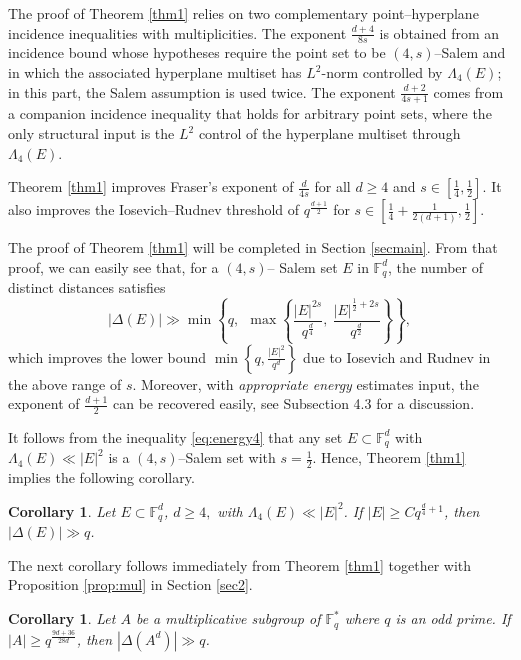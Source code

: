 \documentclass[11pt]{article}
\newtheorem{corollary}[theorem]{Corollary}
\begin{document}
The proof of Theorem \ref{thm1} relies on two complementary
point--hyperplane incidence inequalities with multiplicities. The exponent
\(\frac{d+4}{8s}\) is obtained from an incidence bound whose hypotheses require
the point set to be \((4,s)\)--Salem and in which the associated hyperplane
multiset has \(L^2\)-norm controlled by \(\Lambda_4(E)\); in this part, the
Salem assumption is used twice. The exponent \(\frac{d+2}{4s+1}\) comes from a
companion incidence inequality that holds for arbitrary point sets, where the
only structural input is the \(L^2\) control of the hyperplane multiset through
\(\Lambda_4(E)\).



 Theorem \ref{thm1} improves Fraser's exponent of $\frac{d}{4s}$ for all $d \geq 4$ and $s \in [\frac{1}{4}, \frac{1}{2}]$. It also improves the Iosevich--Rudnev threshold of $q^{\frac{d+1}{2}}$ for $s \in [\frac{1}{4} + \frac{1}{2(d+1)}, \frac{1}{2}]$.


The proof of Theorem \ref{thm1} will be completed in Section \ref{secmain}. From that proof, we can easily see that, for a $(4, s)$-- Salem set $E$ in $\mathbb{F}_q^d$, the number of distinct distances satisfies
\[|\Delta(E)|\gg \min \left\lbrace q, ~~\max\left\lbrace \frac{|E|^{2s}}{q^{\frac{d}{4}}}, ~\frac{|E|^{\frac{1}{2}+2s}}{q^{\frac{d}{2}}}\right\rbrace \right\rbrace,\]
which improves the lower bound $\min\left\lbrace q, \frac{|E|^2}{q^d}\right\rbrace$ due to Iosevich and Rudnev in the above range of $s$. Moreover, with \textit{appropriate energy} estimates input, the exponent of $\frac{d+1}{2}$ can be recovered easily, see Subsection 4.3 for a discussion.


It follows from the inequality \eqref{eq:energy4} that any set $E\subset \mathbb F_q^d$ with $\Lambda_4(E)\ll |E|^2$  is a $(4, s)$--Salem set with $s=\frac{1}{2}$.  Hence, Theorem \ref{thm1} implies the following corollary. 
\begin{corollary}\label{multigroup}
    Let $E\subset \mathbb{F}_q^d$, $d\ge 4,$ with $\Lambda_4(E)\ll |E|^2$. If $|E|\ge C q^{\frac{d}{4}+1}$, then $|\Delta(E)|\gg q$.
\end{corollary}
The next corollary follows immediately from Theorem \ref{thm1} together with Proposition \ref{prop:mul} in Section \ref{sec2}.
\begin{corollary}\label{corK}
   Let $A$ be a multiplicative subgroup of $\mathbb{F}_q^*$  where $q$ is an odd prime. If $|A|\ge q^{\frac{9d+36}{28d}}$, then $|\Delta(A^d)|\gg q$.
\end{corollary}
\end{document}
